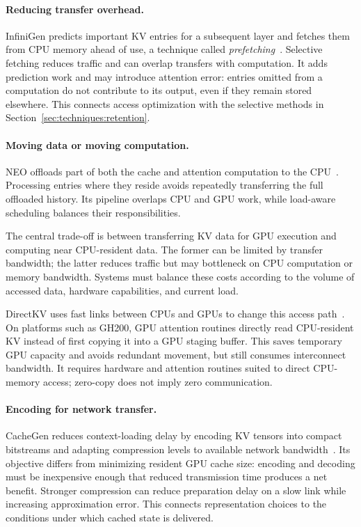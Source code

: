 \paragraph{Reducing transfer overhead.}
InfiniGen predicts important KV entries for a subsequent layer and fetches them from CPU memory ahead of use, a technique called \emph{prefetching}~\cite{kv_lee2024infinigen}. Selective fetching reduces traffic and can overlap transfers with computation. It adds prediction work and may introduce attention error: entries omitted from a computation do not contribute to its output, even if they remain stored elsewhere. This connects access optimization with the selective methods in Section~\ref{sec:techniques:retention}.

\paragraph{Moving data or moving computation.}
NEO offloads part of both the cache and attention computation to the CPU~\cite{kv_jiang2025neo}. Processing entries where they reside avoids repeatedly transferring the full offloaded history. Its pipeline overlaps CPU and GPU work, while load-aware scheduling balances their responsibilities.

The central trade-off is between transferring KV data for GPU execution and computing near CPU-resident data. The former can be limited by transfer bandwidth; the latter reduces traffic but may bottleneck on CPU computation or memory bandwidth. Systems must balance these costs according to the volume of accessed data, hardware capabilities, and current load.

DirectKV uses fast links between CPUs and GPUs to change this access path~\cite{kv_luo2026directkv}. On platforms such as GH200, GPU attention routines directly read CPU-resident KV instead of first copying it into a GPU staging buffer. This saves temporary GPU capacity and avoids redundant movement, but still consumes interconnect bandwidth. It requires hardware and attention routines suited to direct CPU-memory access; zero-copy does not imply zero communication.

\paragraph{Encoding for network transfer.}
CacheGen reduces context-loading delay by encoding KV tensors into compact bitstreams and adapting compression levels to available network bandwidth~\cite{kv_liu2024cachegen}. Its objective differs from minimizing resident GPU cache size: encoding and decoding must be inexpensive enough that reduced transmission time produces a net benefit. Stronger compression can reduce preparation delay on a slow link while increasing approximation error. This connects representation choices to the conditions under which cached state is delivered.


